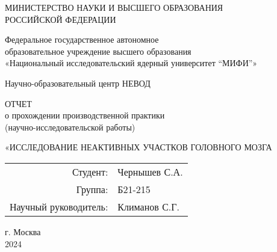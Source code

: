 \thispagestyle{empty}

\begin{center}
    МИНИСТЕРСТВО НАУКИ И ВЫСШЕГО ОБРАЗОВАНИЯ \\ РОССИЙСКОЙ ФЕДЕРАЦИИ

    \vspace{20pt}

    Федеральное государственное автономное \\ образовательное учреждение высшего образования \\
    «Национальный исследовательский ядерный университет “МИФИ”» 

    \vspace{20pt}

    {Научно-образовательный центр НЕВОД}
\end{center}

\vfill

\begin{center}
    ОТЧЕТ \\  
     о прохождении производственной практики \\ (научно-исследовательской работы)

    \vspace{20pt}

    \uppercase{«Исследование неактивных участков головного мозга}
\end{center}

\vfill
\hfill
\begin{flushright}
    \begin{tabular}{rl}
        Студент: & Чернышев С.А. \\[0.5cm]
        Группа: & Б21-215 \\[0.5cm]
        Научный руководитель: & Климанов С.Г. \\
    \end{tabular}
\end{flushright}
\vfill

\begin{center}
    г. Москва\\
 2024
\end{center}